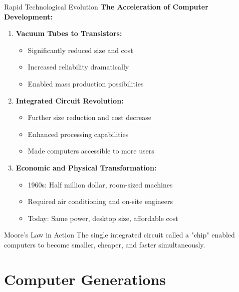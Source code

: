 \documentclass[aspectratio=169]{beamer}
\begin{document}
\begin{frame}{Rapid Technological Evolution}
    \textbf{The Acceleration of Computer Development:}
    
    \begin{enumerate}
        \item \textbf{Vacuum Tubes to Transistors:}
        \begin{itemize}
            \item Significantly reduced size and cost
            \item Increased reliability dramatically
            \item Enabled mass production possibilities
        \end{itemize}
        
        \item \textbf{Integrated Circuit Revolution:}
        \begin{itemize}
            \item Further size reduction and cost decrease
            \item Enhanced processing capabilities
            \item Made computers accessible to more users
        \end{itemize}
        
        \item \textbf{Economic and Physical Transformation:}
        \begin{itemize}
            \item 1960s: Half million dollar, room-sized machines
            \item Required air conditioning and on-site engineers
            \item Today: Same power, desktop size, affordable cost
        \end{itemize}
    \end{enumerate}
    
    \begin{alertblock}{Moore's Law in Action}
        The single integrated circuit called a "chip" enabled computers to become smaller, cheaper, and faster simultaneously.
    \end{alertblock}
\end{frame}

\section{Computer Generations}
\end{document}
